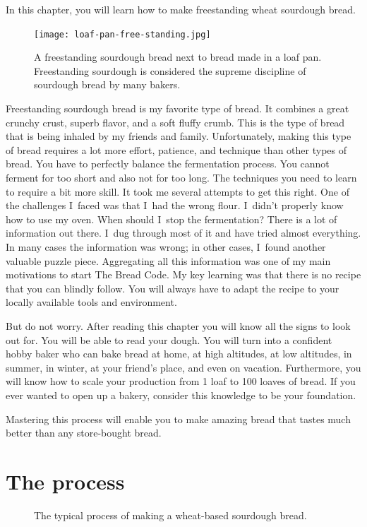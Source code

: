 In this chapter, you will learn how to make
freestanding wheat sourdough bread.

\begin{figure}[!htb]
  \texttt{[image: loaf-pan-free-standing.jpg]}
  \caption{A freestanding sourdough bread next to bread made in a loaf pan.
  Freestanding sourdough is considered the supreme discipline of sourdough bread by many bakers.
  }
\end{figure}

Freestanding sourdough bread is my favorite
type of bread. It combines a great crunchy crust, superb
flavor, and a soft fluffy crumb. This is the type of bread
that is being inhaled by my friends and family. Unfortunately,
making this type of bread requires a lot more effort, patience,
and technique than other types of bread. You have to perfectly
balance the fermentation process. You cannot ferment for too
short and also not for too long. The techniques you need to
learn to require a bit more skill. It took me several attempts
to get this right. One of the challenges I~faced was that
I~had the wrong flour. I~didn't properly know how to use my oven.
When should I~stop the fermentation? There is a lot of information
out there. I~dug through most of it and have tried almost everything.
In many cases the information was wrong; in other cases, I~found another
valuable puzzle piece. Aggregating all this
information was one of my main motivations to start The Bread Code.
My key learning was that there is no recipe that
you can blindly follow. You will always have to adapt the recipe
to your locally available tools and environment.

But do not worry. After reading this chapter you will know
all the signs to look out for. You will be able to read your dough.
You will turn into a confident hobby baker who can bake bread
at home, at high altitudes, at low altitudes, in summer, in winter,
at your friend's place, and even on vacation. Furthermore,
you will know how to scale your production from 1 loaf to 100 loaves of bread.
If you ever wanted to open up a bakery, consider this knowledge to
be your foundation.

Mastering this process will enable you to make amazing bread
that tastes much better than any store-bought bread.

\section{The process}

\begin{figure}[!htb]
\begin{center}
  
  \caption{The typical process of making a wheat-based sourdough bread.}%
  \label{fig:wheat-sourdough-process}
\end{center}
\end{figure}

